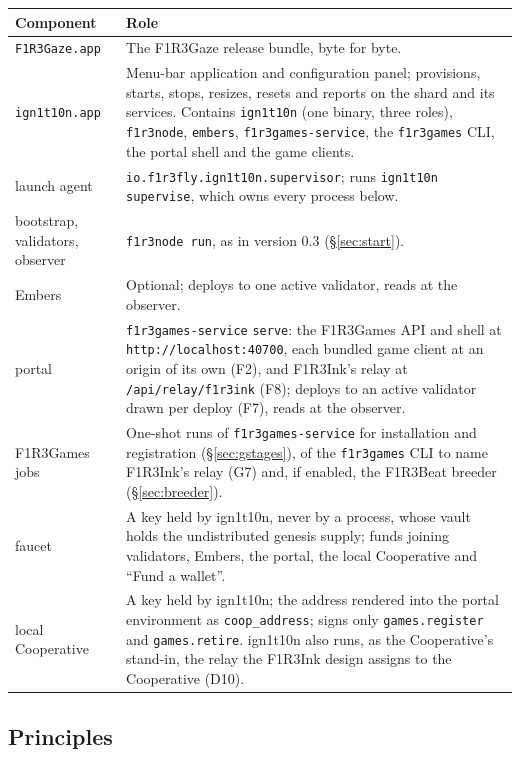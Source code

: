 \documentclass[11pt]{article}
\theoremstyle{definition}
\theoremstyle{remark}
\newcommand{\code}[1]{\texttt{#1}}
\newcommand{\Gz}{F1R3Gaze}
\newcommand{\Hr}{ign1t10n}
\newcommand{\Gm}{F1R3Games}
\newcommand{\Svc}{\code{f1r3games-service}}
\newcommand{\Em}{Embers}
\begin{document}
\begin{center}\small
\renewcommand{\arraystretch}{1.15}
\begin{tabularx}{\linewidth}{@{}p{3.3cm}X@{}}
\toprule
Component & Role\\
\midrule
\code{F1R3Gaze.app} & The \Gz{} release bundle, byte for byte.\\
\code{ign1t10n.app} & Menu-bar application and configuration panel; provisions, starts, stops, resizes, resets and reports on the shard and its services. Contains \code{ign1t10n} (one binary, three roles), \code{f1r3node}, \code{embers}, \code{f1r3games-service}, the \code{f1r3games} CLI, the portal shell and the game clients.\\
launch agent & \code{io.f1r3fly.ign1t10n.supervisor}; runs \code{ign1t10n supervise}, which owns every process below.\\
bootstrap, validators, observer & \code{f1r3node run}, as in version 0.3 (\S\ref{sec:start}).\\
\Em{} & Optional; deploys to one active validator, reads at the observer.\\
portal & \Svc{} \code{serve}: the \Gm{} API and shell at \code{http://localhost:40700}, each bundled game client at an origin of its own (F2), and F1R3Ink's relay at \code{/api/relay/f1r3ink} (F8); deploys to an active validator drawn per deploy (F7), reads at the observer.\\
\Gm{} jobs & One-shot runs of \Svc{} for installation and registration (\S\ref{sec:gstages}), of the \code{f1r3games} CLI to name F1R3Ink's relay (G7) and, if enabled, the F1R3Beat breeder (\S\ref{sec:breeder}).\\
faucet & A key held by \Hr{}, never by a process, whose vault holds the undistributed genesis supply; funds joining validators, \Em{}, the portal, the local Cooperative and ``Fund a wallet''.\\
local Cooperative & A key held by \Hr{}; the address rendered into the portal environment as \code{coop\_address}; signs only \code{games.register} and \code{games.retire}. \Hr{} also runs, as the Cooperative's stand-in, the relay the F1R3Ink design assigns to the Cooperative (D10).\\
\bottomrule
\end{tabularx}
\end{center}

\subsection{Principles}
\end{document}
